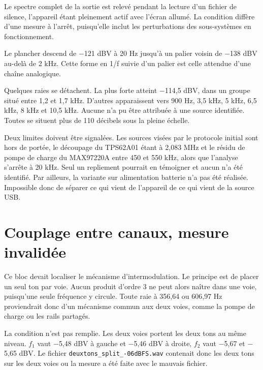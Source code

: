 Le spectre complet de la sortie est relevé pendant la lecture d'un fichier de silence, l'appareil étant pleinement actif avec l'écran allumé. La condition diffère d'une mesure à l'arrêt, puisqu'elle inclut les perturbations des sous-systèmes en fonctionnement.


Le plancher descend de $-$121 dBV à 20 Hz jusqu'à un palier voisin de $-$138 dBV au-delà de 2 kHz. Cette forme en 1/f suivie d'un palier est celle attendue d'une chaîne analogique.

Quelques raies se détachent. La plus forte atteint $-$114,5 dBV, dans un groupe situé entre 1,2 et 1,7 kHz. D'autres apparaissent vers 900 Hz, 3,5 kHz, 5 kHz, 6,5 kHz, 8 kHz et 10,5 kHz. Aucune n'a pu être attribuée à une source identifiée. Toutes se situent plus de 110 décibels sous la pleine échelle.

Deux limites doivent être signalées. Les sources visées par le protocole initial sont hors de portée, le découpage du TPS62A01 étant à 2,083 MHz et le résidu de pompe de charge du MAX97220A entre 450 et 550 kHz, alors que l'analyse s'arrête à 20 kHz. Seul un repliement pourrait en témoigner et aucun n'a été identifié. Par ailleurs, la variante sur alimentation batterie n'a pas été réalisée. Impossible donc de séparer ce qui vient de l'appareil de ce qui vient de la source USB.

\section{Couplage entre canaux, mesure invalidée}
\label{ann:imd:b4}

Ce bloc devait localiser le mécanisme d'intermodulation. Le principe est de placer un seul ton par voie. Aucun produit d'ordre 3 ne peut alors naître dans une voie, puisqu'une seule fréquence y circule. Toute raie à 356,64 ou 606,97 Hz proviendrait donc d'un mécanisme commun aux deux voies, comme la pompe de charge ou les rails partagés.


La condition n'est pas remplie. Les deux voies portent les deux tons au même niveau. $f_1$ vaut $-$5,48 dBV à gauche et $-$5,46 dBV à droite, $f_2$ vaut $-$5,67 et $-$5,65 dBV. Le fichier \texttt{deuxtons\_split\_-06dBFS.wav} contenait donc les deux tons sur les deux voies ou la mesure a été faite avec le mauvais fichier.

